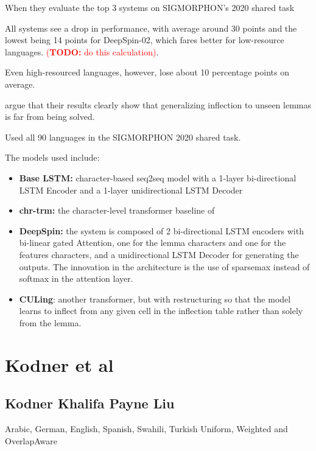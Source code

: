 \documentclass[11pt]{article}
\newcommand{\todo}[1]{\textcolor{red}{(\textbf{TODO:} #1)}}
\begin{document}
When they evaluate the top 3 systems on SIGMORPHON's 2020 shared task

All systems see a drop in performance, with average around 30 points and the lowest being 14 points for DeepSpin-02, which fares better for low-resource languages. \todo{do this calculation}. 

Even high-resourced languages, however, lose about 10 percentage points on average. 


\citeauthor{goldman-etal-2022-un} argue that their results clearly show that generalizing inflection to unseen lemmas is far from being solved. 





Used all 90 languages in the SIGMORPHON 2020 shared task. 

The models used include: 
\begin{itemize}
\item \textbf{Base LSTM:} character-based seq2seq model with a 1-layer bi-directional LSTM Encoder and a 1-layer unidirectional LSTM Decoder
\item \textbf{chr-trm:} the character-level transformer baseline of \citet{wu-etal-2021-applying}
\item \textbf{DeepSpin:} the system is composed of 2 bi-directional LSTM encoders with bi-linear gated Attention, one for the lemma characters and one for the features characters, and a unidirectional LSTM Decoder for generating the outputs. The innovation in the architecture is the use of sparsemax \citep{sparsemax} instead of softmax in the attention layer. \citep{peters-martins-2020-one}
\item \textbf{CULing}: another transformer, but with restructuring so that the model learns to inflect from any given cell in the inflection table rather than solely from the lemma. \citep{liu-hulden-2020-leveraging}
\end{itemize}



\section{Kodner et al}


\subsection{Kodner Khalifa Payne Liu}

Arabic, German, English, Spanish, Swahili, Turkish 
Uniform, Weighted and OverlapAware 
\end{document}

